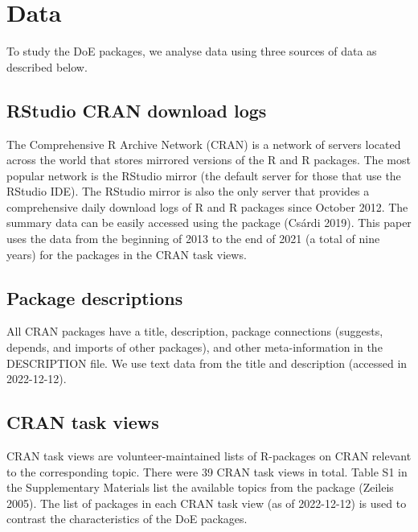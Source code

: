 \hypertarget{data}{%
\section{Data}\label{data}}

To study the DoE packages, we analyse data using three sources of data as described below.

\hypertarget{rstudio-cran-download-logs}{%
\subsection{RStudio CRAN download logs}\label{rstudio-cran-download-logs}}

The Comprehensive R Archive Network (CRAN) is a network of servers located across the world that stores mirrored versions of the R and R packages. The most popular network is the RStudio mirror (the default server for those that use the RStudio IDE). The RStudio mirror is also the only server that provides a comprehensive daily download logs of R and R packages since October 2012. The summary data can be easily accessed using the  package (Csárdi 2019). This paper uses the data from the beginning of 2013 to the end of 2021 (a total of nine years) for the packages in the CRAN task views.

\hypertarget{package-descriptions}{%
\subsection{Package descriptions}\label{package-descriptions}}

All CRAN packages have a title, description, package connections (suggests, depends, and imports of other packages), and other meta-information in the DESCRIPTION file. We use text data from the title and description (accessed in 2022-12-12).

\hypertarget{cran-task-views}{%
\subsection{CRAN task views}\label{cran-task-views}}

CRAN task views are volunteer-maintained lists of R-packages on CRAN relevant to the corresponding topic. There were 39 CRAN task views in total. Table S1 in the Supplementary Materials list the available topics from the  package (Zeileis 2005).
The list of packages in each CRAN task view (as of 2022-12-12) is used to contrast the characteristics of the DoE packages.

